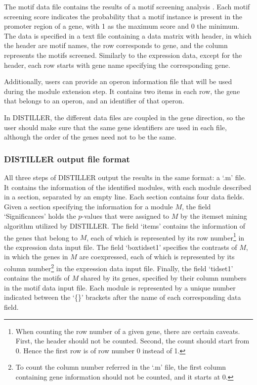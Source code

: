 The motif data file contains the results of a motif screening analysis \cite{Hertzberg2005}.  Each motif screening score indicates the probability that a motif instance is present in the promoter region of a gene, with 1 as the maximum score and 0 the minimum. The data is specified in a text file containing a data matrix with header, in which the header are motif names, the row corresponds to gene, and the column represents the motifs screened.  Similarly to the expression data, except for the header, each row starts with gene name specifying the corresponding gene.

Additionally, users can provide an operon information file that will be used during the module extension step.  It contains two items in each row, the gene that belongs to an operon, and an identifier of that operon.

In DISTILLER, the different data files are coupled in the gene direction, so the user should make sure that the same gene identifiers are used in each file, although the order of the genes need not to be the same.


\subsubsection{DISTILLER output file format}\label{sec:distiller-outfile-format}
All three steps of DISTILLER output the results in the same format: a `.m' file. It contains the information of the identified modules, with each module described in a section, separated by an empty line.   Each section contains four data fields.  Given a section specifying the information for a module $M$, the field `Significances' holds the $p$-values that were assigned to $M$ by the itemset mining algorithm \cite{Zaki} utilized by DISTILLER.  The field `items' contains the information of the genes that belong to $M$, each of which is represented by its row number\footnote{When   counting the row number of a given gene, there are certain caveats. First, the   header should not be counted.  Second, the count should start from 0. Hence   the first row is of row number 0 instead of 1.} in the expression data input file. The field `boxtidset1' specifies the contrasts of $M$, in which the genes in $M$ are coexpressed, each of which is represented by its column number\footnote{To count the column number referred in the `.m' file, the first   column containing gene information should not be counted, and it starts at 0.} in the expression data input file. Finally, the field `tidset1' contains the motifs of $M$ shared by its genes, specified by their column numbers in the motif data input file.   Each module is represented by a unique number indicated between the `\{\}' brackets after the name of each corresponding data field.

